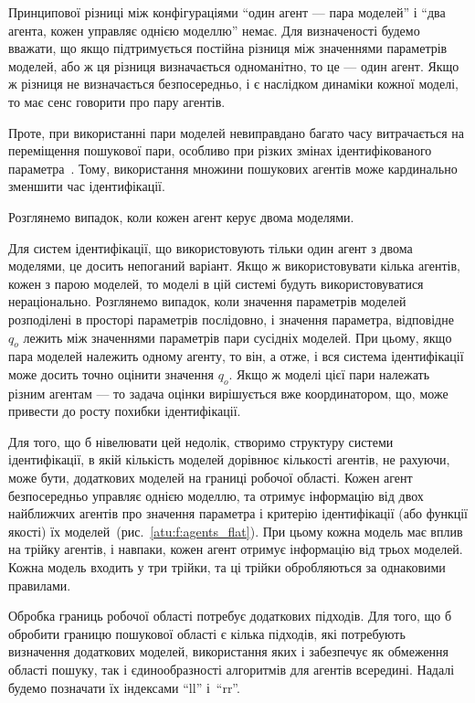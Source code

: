 Принципової різниці між конфігураціями ``один агент --- пара моделей''
і ``два агента, кожен управляє однією моделлю''
немає. Для визначеності будемо вважати, що якщо підтримується
постійна різниця між значеннями параметрів моделей, або ж ця
різниця визначається одноманітно, то це --- один агент. Якщо ж
різниця не визначається безпосередньо, і є наслідком динаміки
кожної моделі, то має сенс говорити про пару агентів.

Проте, при використанні пари моделей невиправдано багато часу
витрачається на переміщення пошукової пари, особливо при різких
змінах ідентифікованого параметра~\cite{atu_asau23}.
Тому, використання множини
пошукових агентів може кардинально зменшити час ідентифікації.


Розглянемо випадок, коли кожен агент
керує двома моделями.

Для систем ідентифікації, що використовують тільки один
агент з двома моделями, це досить непоганий варіант. Якщо ж
використовувати кілька агентів, кожен з парою моделей,
то моделі в цій системі будуть використовуватися
нераціонально. Розглянемо випадок, коли значення параметрів
моделей розподілені в просторі параметрів послідовно, і
значення параметра, відповідне
$q_o$ лежить між значеннями параметрів пари сусідніх моделей. При
цьому, якщо пара моделей належить одному агенту, то він, а отже,
і вся система ідентифікації може досить точно оцінити значення
$q_o$.
Якщо ж моделі цієї пари належать різним агентам ---
то задача оцінки вирішується вже координатором,
що, може привести до росту похибки ідентифікації.

Для того, що б нівелювати цей недолік, створимо структуру системи
ідентифікації, в якій кількість моделей дорівнює кількості
агентів, не рахуючи, може бути, додаткових моделей на границі
робочої області.
Кожен агент безпосередньо управляє однією моделлю,
та отримує інформацію від двох найближчих агентів
про значення параметра і критерію ідентифікації
(або функції якості) їх моделей~(рис.~\ref{atu:f:agents_flat}).
При цьому кожна модель має вплив на трійку агентів,
і навпаки, кожен агент отримує інформацію від трьох моделей.
Кожна модель входить у три трійки, та ці трійки обробляються за
однаковими правилами.


Обробка границь робочої області потребує додаткових підходів.
Для того, що б обробити границю
пошукової області є кілька підходів, які потребують визначення
додаткових моделей, використання яких і забезпечує як обмеження
області пошуку, так і єдинообразності алгоритмів для агентів
всередині. Надалі будемо позначати їх індексами ``ll'' і~``rr''.


